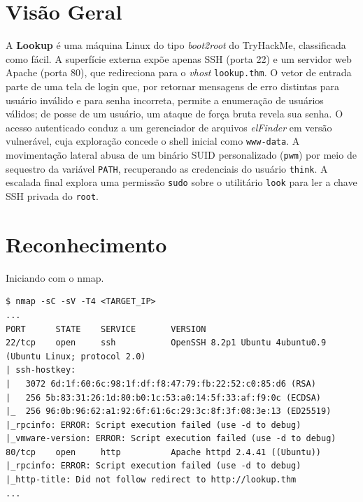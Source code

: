 \documentclass[12pt]{article}
\begin{document}
\section{Visão Geral}

A \textbf{Lookup} é uma máquina Linux do tipo \textit{boot2root} do TryHackMe, classificada como fácil. A superfície externa expõe apenas SSH (porta 22) e um servidor web Apache (porta 80), que redireciona para o \textit{vhost} \texttt{lookup.thm}. O vetor de entrada parte de uma tela de login que, por retornar mensagens de erro distintas para usuário inválido e para senha incorreta, permite a enumeração de usuários válidos; de posse de um usuário, um ataque de força bruta revela sua senha. O acesso autenticado conduz a um gerenciador de arquivos \textit{elFinder} em versão vulnerável, cuja exploração concede o shell inicial como \texttt{www-data}. A movimentação lateral abusa de um binário SUID personalizado (\texttt{pwm}) por meio de sequestro da variável \texttt{PATH}, recuperando as credenciais do usuário \texttt{think}. A escalada final explora uma permissão \texttt{sudo} sobre o utilitário \texttt{look} para ler a chave SSH privada do \texttt{root}.

\section{Reconhecimento}

Iniciando com o nmap.

\begin{lstlisting}[caption={Varredura de portas com Nmap}, label={lst:nmap}]
$ nmap -sC -sV -T4 <TARGET_IP>
...
PORT      STATE    SERVICE       VERSION
22/tcp    open     ssh           OpenSSH 8.2p1 Ubuntu 4ubuntu0.9 (Ubuntu Linux; protocol 2.0)
| ssh-hostkey: 
|   3072 6d:1f:60:6c:98:1f:df:f8:47:79:fb:22:52:c0:85:d6 (RSA)
|   256 5b:83:31:26:1d:80:b0:1c:53:a0:14:5f:33:af:f9:0c (ECDSA)
|_  256 96:0b:96:62:a1:92:6f:61:6c:29:3c:8f:3f:08:3e:13 (ED25519)
|_rpcinfo: ERROR: Script execution failed (use -d to debug)
|_vmware-version: ERROR: Script execution failed (use -d to debug)
80/tcp    open     http          Apache httpd 2.4.41 ((Ubuntu))
|_rpcinfo: ERROR: Script execution failed (use -d to debug)
|_http-title: Did not follow redirect to http://lookup.thm
...
\end{lstlisting}
\end{document}
